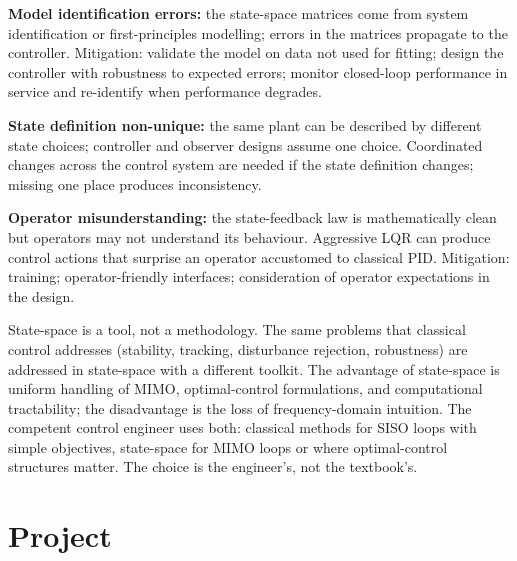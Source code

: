 \textbf{Model identification errors:} the state-space matrices come from system identification or first-principles modelling; errors in the matrices propagate to the controller. Mitigation: validate the model on data not used for fitting; design the controller with robustness to expected errors; monitor closed-loop performance in service and re-identify when performance degrades.

\textbf{State definition non-unique:} the same plant can be described by different state choices; controller and observer designs assume one choice. Coordinated changes across the control system are needed if the state definition changes; missing one place produces inconsistency.

\textbf{Operator misunderstanding:} the state-feedback law is mathematically clean but operators may not understand its behaviour. Aggressive LQR can produce control actions that surprise an operator accustomed to classical PID. Mitigation: training; operator-friendly interfaces; consideration of operator expectations in the design.

\begin{principle}
State-space is a tool, not a methodology. The same problems that classical control addresses (stability, tracking, disturbance rejection, robustness) are addressed in state-space with a different toolkit. The advantage of state-space is uniform handling of MIMO, optimal-control formulations, and computational tractability; the disadvantage is the loss of frequency-domain intuition. The competent control engineer uses both: classical methods for SISO loops with simple objectives, state-space for MIMO loops or where optimal-control structures matter. The choice is the engineer's, not the textbook's.
\end{principle}

\section{Project}

